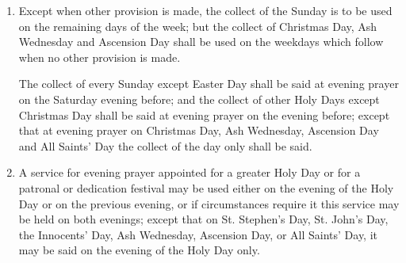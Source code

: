 \begin{enumerate}
    \item Except when other provision is made, the collect of the Sunday is to be used on the remaining days of the week; but the collect of Christmas Day, Ash Wednesday and Ascension Day shall be used on the weekdays which follow when no other provision is made.

          The collect of every Sunday except Easter Day shall be said at evening prayer on the Saturday evening before; and the collect of other Holy Days except Christmas Day shall be said at evening prayer on the evening before; except that at evening prayer on Christmas Day, Ash Wednesday, Ascension Day and All Saints' Day the collect of the day only shall be said.

    \item A service for evening prayer appointed for a greater Holy Day or for a patronal or dedication festival may be used either on the evening of the Holy Day or on the previous evening, or if circumstances require it this service may be held on both evenings; except that on St. Stephen's Day, St. John's Day, the Innocents' Day, Ash Wednesday, Ascension Day, or All Saints' Day, it may be said on the evening of the Holy Day only.

\end{enumerate}

\clearpage
